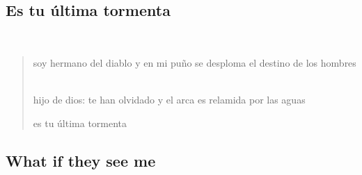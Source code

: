 \documentclass[a4paper, 12pt]{article}
\begin{document}
\pagebreak
\subsection{Es tu última tormenta}
~ 

\begin{verse}
    
soy hermano del diablo y en mi puño
se desploma el destino de los hombres
~

hijo de dios: te han olvidado
y el arca es relamida por las aguas
~

es tu última tormenta
\end{verse}

\pagebreak

\subsection{What if they see me}
~ 
\end{document}
